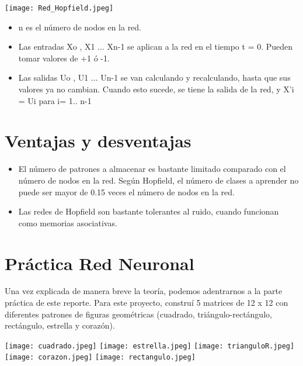 \documentclass[12pt]{article}
\begin{document}
\begin{center}
    \texttt{[image: Red\_Hopfield.jpeg]}
\end{center}

\begin{itemize}
    \item n es el número de nodos en la red. 
    \item Las entradas Xo , X1 ... Xn-1 se aplican a la red en el tiempo t = 0. Pueden tomar valores de +1 ó -1.
    \item Las salidas Uo , U1 ... Un-1 se van calculando y recalculando, hasta que sus valores ya no cambian. Cuando esto sucede, se tiene la salida de la red, y X’i = Ui para i= 1.. n-1
\end{itemize}

\section*{Ventajas y desventajas}

\begin{itemize}
   
    \item El número de patrones a almacenar es bastante limitado comparado con el número de nodos en la red. Según Hopfield, el número de clases a aprender no puede ser mayor de 0.15 veces el número de nodos en la red.
    \item Las redes de Hopfield son bastante tolerantes al ruido, cuando funcionan como memorias asociativas.
    
\end{itemize}

\section*{Práctica Red Neuronal}

Una vez explicada de manera breve la teoría, podemos adentrarnos a la parte práctica de este reporte. Para este proyecto, construí 5 matrices de 12 x 12 con diferentes patrones de figuras geométricas (cuadrado, triángulo-rectángulo, rectángulo, estrella y corazón).  
      
         \begin{center}
            \texttt{[image: cuadrado.jpeg]}
            \texttt{[image: estrella.jpeg]} 
            \texttt{[image: trianguloR.jpeg]}
            \texttt{[image: corazon.jpeg]} 
            \texttt{[image: rectangulo.jpeg]}
         \end{center}
\end{document}
